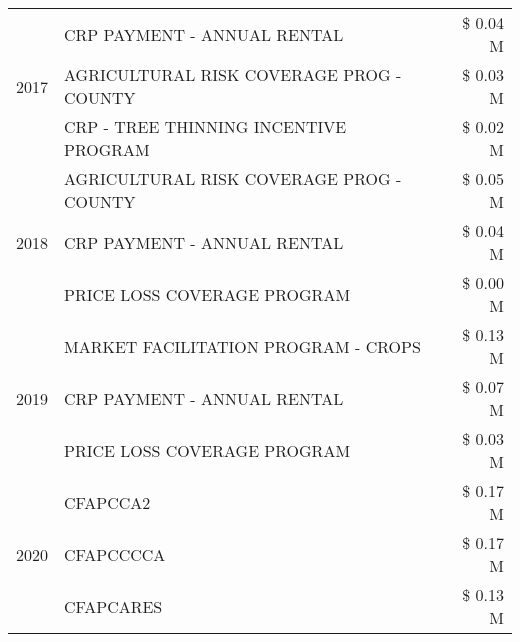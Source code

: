 \begin{tabular}{llr}
\cline{1-3}
\multirow[t]{3}{*}{2017} & CRP PAYMENT - ANNUAL RENTAL & \$ 0.04 M \\
 & AGRICULTURAL RISK COVERAGE PROG - COUNTY & \$ 0.03 M \\
 & CRP - TREE THINNING INCENTIVE PROGRAM & \$ 0.02 M \\
\cline{1-3}
\multirow[t]{3}{*}{2018} & AGRICULTURAL RISK COVERAGE PROG - COUNTY & \$ 0.05 M \\
 & CRP PAYMENT - ANNUAL RENTAL & \$ 0.04 M \\
 & PRICE LOSS COVERAGE PROGRAM & \$ 0.00 M \\
\cline{1-3}
\multirow[t]{3}{*}{2019} & MARKET FACILITATION PROGRAM - CROPS & \$ 0.13 M \\
 & CRP PAYMENT - ANNUAL RENTAL & \$ 0.07 M \\
 & PRICE LOSS COVERAGE PROGRAM & \$ 0.03 M \\
\cline{1-3}
\multirow[t]{3}{*}{2020} & CFAPCCA2 & \$ 0.17 M \\
 & CFAPCCCCA & \$ 0.17 M \\
 & CFAPCARES & \$ 0.13 M \\
\cline{1-3}
\bottomrule
\end{tabular}
